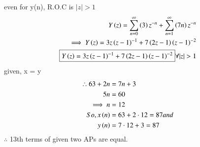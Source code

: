\documentclass[journal,12pt,twocolumn]{IEEEtran}
\theoremstyle{remark}
\begin{document}
\begin{enumerate}
\begin{enumerate}
even for y(n), R.O.C is $ |z|>1$\\
\begin{align}
Y\brak{z} = \sum_{n=0}^{\infty} \brak{3}z^{-n}+\sum_{n=1}^{\infty}\brak{7n}z^{-n}\\
\implies Y\brak{z} = 3z\brak{z-1}^{-1} + 7\brak{2z-1}\brak{z-1}^{-2}\\
\boxed{Y\brak{z} = 3z\brak{z-1}^{-1} + 7\brak{2z-1}\brak{z-1}^{-2}} \forall  |z|>1 \label{eq:6}
\end{align}
given, x = y\\
\begin{align}
\therefore 63 + 2n &= 7n+3\\
5n &= 60\\
\implies n &= 12\\
So, x\left(n\right) &= 63 + 2\cdot12 = 87  and\\
y\left(n\right) &= 7\cdot12 + 3 = 87
\end{align}
$ \therefore$ 13th terms of given two APs are equal.\\\\
\end{enumerate}
\end{enumerate}
\end{document}
